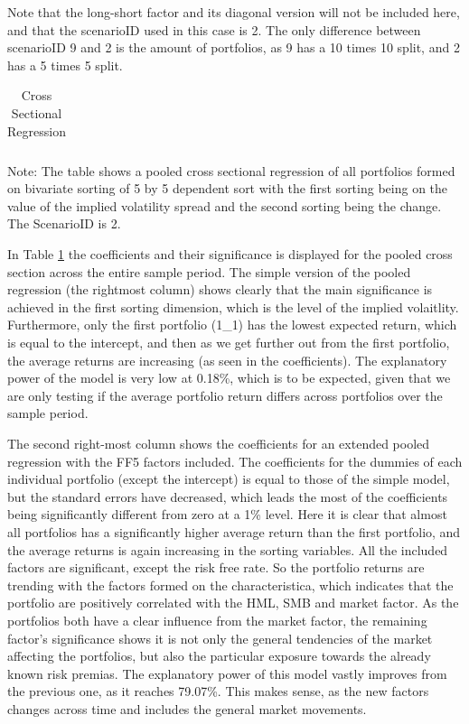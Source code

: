 Note that the long-short factor and its diagonal version will not be included here, and that the scenarioID used in this case is 2. The only difference between scenarioID 9 and 2 is the amount of portfolios, as 9 has a 10 times 10 split, and 2 has a 5 times 5 split.

\begin{table}[h]
	\centering
	
	\caption{Cross Sectional Regression}
	\label{tab:cross_sec_regs}
	
	\begin{tabular}{l|lll}
		
	\end{tabular}

	{\small Note: The table shows a pooled cross sectional regression of all portfolios formed on bivariate sorting of 5 by 5 dependent sort with the first sorting being on the value of the implied volatility spread and the second sorting being the change. The ScenarioID is 2.}

\end{table}

In Table \ref{tab:cross_sec_regs} the coefficients and their significance is displayed for the pooled cross section across the entire sample period. The simple version of the pooled regression (the rightmost column) shows clearly that the main significance is achieved in the first sorting dimension, which is the level of the implied volaitlity. Furthermore, only the first portfolio (1\_1) has the lowest expected return, which is equal to the intercept, and then as we get further out from the first portfolio, the average returns are increasing (as seen in the coefficients). The explanatory power of the model is very low at 0.18\%, which is to be expected, given that we are only testing if the average portfolio return differs across portfolios over the sample period.

The second right-most column shows the coefficients for an extended pooled regression with the FF5 factors included. The coefficients for the dummies of each individual portfolio (except the intercept) is equal to those of the simple model, but the standard errors have decreased, which leads the most of the coefficients being significantly different from zero at a 1\% level. Here it is clear that almost all portfolios has a significantly higher average return than the first portfolio, and the average returns is again increasing in the sorting variables. All the included factors are significant, except the risk free rate. So the portfolio returns are trending with the factors formed on the characteristica, which indicates that the portfolio are positively correlated with the HML, SMB and market factor. As the portfolios both have a clear influence from the market factor, the remaining factor's significance shows it is not only the general tendencies of the market affecting the portfolios, but also the particular exposure towards the already known risk premias. The explanatory power of this model vastly improves from the previous one, as it reaches 79.07\%. This makes sense, as the new factors changes across time and includes the general market movements.

